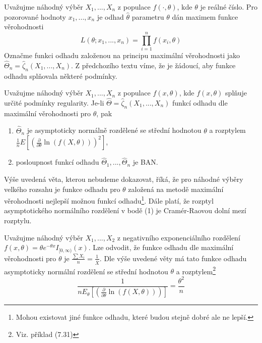 Uvažujme náhodný výběr $X_1, ..., X_n$ z populace $f(\cdot, \theta)$, kde $\theta$ je reálné číslo. Pro pozorované hodnoty $x_1, ..., x_n$ je odhad $\hat{\theta}$ parametru $\theta$ dán maximem funkce věrohodnosti
\begin{equation*}
L(\theta; x_1, ..., x_n) = \prod_{i = 1}^n f(x_i, \theta)
\end{equation*}
Označme funkci odhadu založenou na principu maximální věrohodnosti jako $\hat{\Theta}_n = \hat{\zeta}_n(X_1, ..., X_n)$. Z předchozího textu víme, že je žádoucí, aby funkce odhadu splňovala některé podmínky.
\begin{theorem}
Uvažujme náhodný výběr $X_1, ..., X_n$ z populace $f(x, \theta)$, kde $f(x, \theta)$ splňuje určité podmínky regularity. Je-li $\hat{\Theta} = \hat{\zeta}_n(X_1, ..., X_n)$ funkcí odhadu dle maximální věrohodnosti pro $\theta$, pak
\begin{enumerate}
\item $\hat{\Theta}_n$ je asymptoticky normálně rozdělené se střední hodnotou $\theta$ a rozptylem $\frac{1}{n}E\left[\left(\frac{\partial}{\partial \theta} \ln(f(X, \theta))\right)^2\right]$,
\item posloupnost funkcí odhadu $\hat{\Theta}_1, ..., \hat{\Theta}_n$ je BAN.
\end{enumerate}
\end{theorem}

Výše uvedená věta, kterou nebudeme dokazovat, říká, že pro náhodné výběry velkého rozsahu je funkce odhadu pro $\theta$ založená na metodě maximální věrohodnosti nejlepší možnou funkcí odhadu\footnote{Mohou existovat jiné funkce odhadu, které budou stejně dobré ale ne lepší.}. Dále platí, že rozptyl asymptotického normálního rozdělení v bodě (1) je Cramér-Raovou dolní mezí rozptylu.

\begin{example}
Uvažujme náhodný výběr $X_1, ..., X_2$ z negativního exponenciálního rozdělení $f(x, \theta) = \theta e^{-\theta x}I_{[0, \infty)}(x)$. Lze odvodit, že funkce odhadu dle maximální věrohodnosti pro $\theta$ je $\frac{\sum X_i}{n} = \frac{1}{\overline{X}}$. Dle výše uvedené věty má tato funkce odhadu asymptoticky normální rozdělení se střední hodnotou $\theta$ a rozptylem\footnote{Viz. příklad (7.31)}
\begin{equation*}
\frac{1}{n E_{\theta}\left[\left(\frac{\partial}{\partial \theta}\ln(f(X, \theta))\right)\right]} = \frac{\theta^2}{n}
\end{equation*}
\end{example}


